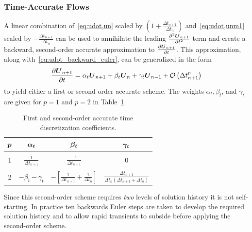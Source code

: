 \subsubsection{Time-Accurate Flows}
A linear combination of~\eqref{eq:udot,un} scaled by $\left(1+\frac{\Delta t_{n+1}}{\Delta t_n}\right)$ and~\eqref{eq:udot,unm1} scaled by $-\frac{\Delta t_{n+1}}{\Delta t_n}$ can be used to annihilate the leading ${\frac{{\partial}^2{{\boldsymbol{U}}_{n+1}}}{\partial{t}^2}}$ term and create a backward, second-order accurate approximation to ${\frac{\partial{{\boldsymbol{U}}_{n+1}}}{\partial{t}}}$.  This approximation, along with~\eqref{eq:udot_backward_euler}, can be generalized in the form
\begin{equation}
  {\frac{\partial{{\boldsymbol{U}}_{n+1}}}{\partial{t}}} = \alpha_t {\boldsymbol{U}}_{n+1} + \beta_t {\boldsymbol{U}}_n + \gamma_t {\boldsymbol{U}}_{n-1} + \mathcal{O}\left(\Delta t_{n+1}^p\right)
  \label{eq:udot_thee_pt_backward}
\end{equation}
to yield either a first or second-order accurate scheme.  The weights $\alpha_t, \beta_t$, and $\gamma_t$ are given for $p=1$ and $p=2$ in Table~\ref{table:udot_weights}.
\begin{table}[hbtp]
  \begin{center}
    \caption{First and second-order accurate time discretization coefficients.\label{table:udot_weights}}
    \vspace{1em}
    \large
    \begin{tabular}{c||ccc}
      ${\boldsymbol{p}}$ & ${\boldsymbol{\alpha_t}}$ & ${\boldsymbol{\beta_t}}$ & ${\boldsymbol{\gamma_t}}$ \\ \hline\hline
          &          &         & \\
       1  & $\frac{1}{\Delta t_{n+1}}$ & $\frac{-1}{\Delta t_{n+1}}$ & 0 \\
          &          &         & \\
       2  & $-\beta_t - \gamma_t$ %
          & $-\left[\frac{1}{\Delta t_{n+1}} + \frac{1}{\Delta t_n}\right]$
          & $\frac{\Delta t_{n+1}}{\Delta t_n\left(\Delta t_{n+1} + \Delta t_n\right)}$ 
    \end{tabular}
  \end{center}
\end{table}
Since this second-order scheme requires \emph{two} levels of solution history it is not self-starting.  In practice ten backwards Euler steps are taken to develop the required  solution history and to allow rapid transients to subside before applying the second-order scheme.


